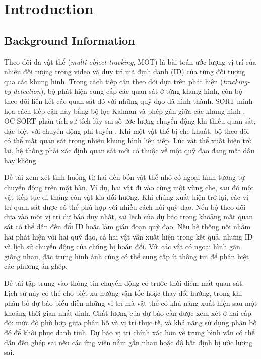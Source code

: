 \chapter{Introduction}
\label{chap:introduction}

\section{Background Information}
\label{sec:background}

Theo dõi đa vật thể (\textit{multi-object tracking}, MOT) là bài toán ước lượng vị trí của nhiều đối tượng trong video và duy trì mã định danh (ID) của từng đối tượng qua các khung hình. Trong cách tiếp cận theo dõi dựa trên phát hiện (\textit{tracking-by-detection}), bộ phát hiện cung cấp các quan sát ở từng khung hình, còn bộ theo dõi liên kết các quan sát đó với những quỹ đạo đã hình thành. SORT minh họa cách tiếp cận này bằng bộ lọc Kalman và phép gán giữa các khung hình \cite{bewley2016sort}. OC-SORT phân tích sự tích lũy sai số ước lượng chuyển động khi thiếu quan sát, đặc biệt với chuyển động phi tuyến \cite{cao2023ocsort}. Khi một vật thể bị che khuất, bộ theo dõi có thể mất quan sát trong nhiều khung hình liên tiếp. Lúc vật thể xuất hiện trở lại, hệ thống phải xác định quan sát mới có thuộc về một quỹ đạo đang mất dấu hay không.

Đề tài xem xét tình huống từ hai đến bốn vật thể nhỏ có ngoại hình tương tự chuyển động trên mặt bàn. Ví dụ, hai vật đi vào cùng một vùng che, sau đó một vật tiếp tục đi thẳng còn vật kia đổi hướng. Khi chúng xuất hiện trở lại, các vị trí quan sát được có thể phù hợp với nhiều cách nối quỹ đạo. Nếu bộ theo dõi dựa vào một vị trí dự báo duy nhất, sai lệch của dự báo trong khoảng mất quan sát có thể dẫn đến đổi ID hoặc làm gián đoạn quỹ đạo. Nếu hệ thống nối nhầm hai phát hiện với hai quỹ đạo, cả hai vật vẫn xuất hiện trong kết quả, nhưng ID và lịch sử chuyển động của chúng bị hoán đổi. Với các vật có ngoại hình gần giống nhau, đặc trưng hình ảnh cũng có thể cung cấp ít thông tin để phân biệt các phương án ghép.

Đề tài tập trung vào thông tin chuyển động có trước thời điểm mất quan sát. Lịch sử này có thể cho biết xu hướng vận tốc hoặc thay đổi hướng, trong khi phân bố dự báo biểu diễn những vị trí mà vật thể có khả năng xuất hiện sau một khoảng thời gian nhất định. Chất lượng của dự báo cần được xem xét ở hai cấp độ: mức độ phù hợp giữa phân bố và vị trí thực tế, và khả năng sử dụng phân bố đó để khôi phục danh tính. Dự báo vị trí chính xác hơn về trung bình vẫn có thể dẫn đến ghép sai nếu các ứng viên nằm gần nhau hoặc độ bất định bị ước lượng sai.

